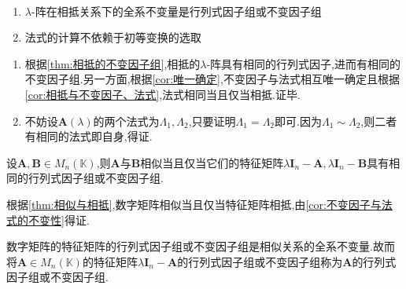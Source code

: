\begin{green}
\begin{corollary}[不变因子与法式的不变性]\label{cor:不变因子与法式的不变性}
    \,

    \begin{enumerate}[label={\textup{(\arabic*)}}]
        \item $\lambda$-阵在相抵关系下的全系不变量是行列式因子组或不变因子组
        \item 法式的计算不依赖于初等变换的选取
    \end{enumerate}
\end{corollary}
\begin{Proof}
\begin{enumerate}[label={\textup{(\arabic*)}}]
    \item 根据\cref{thm:相抵的不变因子组},相抵的$\lambda$-阵具有相同的行列式因子,进而有相同的不变因子组.另一方面,根据\cref{cor:唯一确定},不变因子与法式相互唯一确定且根据\cref{cor:相抵与不变因子、法式},法式相同当且仅当相抵.证毕.
    \item 不妨设$\bm{A}\left(\lambda\right)$的两个法式为$\bm{\varLambda}_1,\bm{\varLambda}_2$,只要证明$\bm{\varLambda}_1=\bm{\varLambda}_2$即可.因为$\bm{\varLambda}_1\sim\bm{\varLambda}_2$,则二者有相同的法式即自身,得证.\qedhere
\end{enumerate}
\end{Proof}
\end{green}
\begin{formal}
\begin{theorem}[数字矩阵与特征矩阵]\label{thm:数字矩阵与特征矩阵}
    设$\bm{A},\bm{B}\in M_n\left(\mathbb{K}\right)$,则$\bm{A}$与$\bm{B}$相似当且仅当它们的特征矩阵$\lambda\bm{I}_n-\bm{A},\lambda\bm{I}_n-\bm{B}$具有相同的行列式因子组或不变因子组.
\end{theorem}
\begin{Proof}
根据\cref{thm:相似与相抵},数字矩阵相似当且仅当特征矩阵相抵,由\cref{cor:不变因子与法式的不变性}得证.
\end{Proof}
\end{formal}
\begin{red}
    \begin{remark}
        数字矩阵的特征矩阵的行列式因子组或不变因子组是相似关系的全系不变量.故而将$\bm{A}\in M_n\left(\mathbb{K}\right)$的特征矩阵$\lambda\bm{I}_n-\bm{A}$的行列式因子组或不变因子组称为$\bm{A}$的行列式因子组或不变因子组.
    \end{remark}
\end{red}
